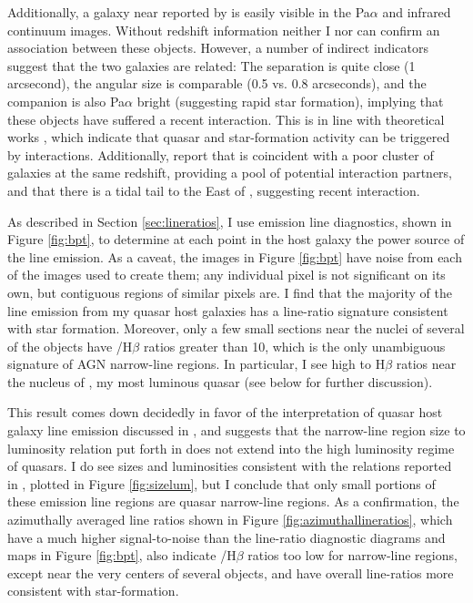 Additionally, a galaxy near  reported by \cite{Yee1987} is easily visible in the Pa$\alpha$ and infrared continuum images. Without redshift  information neither I nor \cite{Yee1987} can confirm an association between these objects. However, a number of indirect indicators suggest that the two galaxies are related: The separation is quite close (1 arcsecond), the angular size is comparable (0.5 vs. 0.8 arcseconds), and the companion is also Pa$\alpha$ bright (suggesting rapid star formation), implying that these objects have suffered a recent interaction. This is in line with theoretical works  \citep[e.g.][]{Springel,DiMatteo,HopkinsQuenching}, which indicate that quasar and star-formation activity can be triggered by interactions. Additionally, \cite{Yee1987} report that  is coincident with a poor cluster of galaxies at the same redshift, providing a pool of potential interaction partners, and that there is a tidal tail to the East of , suggesting recent interaction.


As described in Section \ref{sec:lineratios}, I use emission line diagnostics, shown in Figure \ref{fig:bpt}, to determine at each point in the host galaxy the power source of the line emission. As a caveat, the images in Figure \ref{fig:bpt} have noise from each of the images used to create them; any individual pixel is not significant on its own, but contiguous regions of similar pixels are. I find that the majority of the line emission from my quasar host galaxies has a line-ratio signature consistent with star formation. Moreover, only a few small sections near the nuclei of several of the objects have /H$\beta$ ratios greater than 10, which is the only unambiguous signature of AGN narrow-line regions.  In particular, I see high  to H$\beta$ ratios near the nucleus of , my most luminous quasar (see below for further discussion).

This result comes down decidedly in favor of the interpretation of quasar host galaxy line emission discussed in \cite{Netzer2004}, and suggests that the narrow-line region size to luminosity relation put forth in \cite{Bennert} does not extend into the high luminosity regime of quasars. I do see sizes and luminosities consistent with the relations reported in \cite{Bennert}, plotted in Figure \ref{fig:sizelum}, but I conclude that only small portions of these emission line regions are quasar narrow-line regions. As a confirmation, the azimuthally averaged line ratios shown in Figure \ref{fig:azimuthallineratios}, which have a much higher signal-to-noise than the line-ratio diagnostic diagrams and maps in Figure \ref{fig:bpt}, also indicate /H$\beta$ ratios too low for narrow-line regions, except near the very centers of several objects, and have overall line-ratios more consistent with star-formation.


